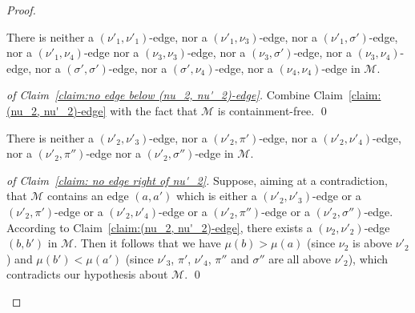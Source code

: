 \documentclass[a4paper]{llncs}
\begin{document}
\begin{proof}
  \begin{claim}
    \label{claim:no edge below (nu_2, nu'_2)-edge}
    There is
    neither a $(\nu'_1, \nu'_1)$-edge,
    nor a $(\nu'_1, \nu_3)$-edge,
    nor a $(\nu'_1, \sigma')$-edge,
    nor a $(\nu'_1, \nu_4)$-edge
    nor a $(\nu_3, \nu_3)$-edge,
    nor a $(\nu_3, \sigma')$-edge,
    nor a $(\nu_3, \nu_4)$-edge,
    nor a $(\sigma', \sigma')$-edge,
    nor a $(\sigma', \nu_4)$-edge,
    nor a $(\nu_4, \nu_4)$-edge
    in $\mathcal{M}$.
  \end{claim}

  \begin{proof}[of Claim~\ref{claim:no edge below (nu_2, nu'_2)-edge}]
    Combine Claim~\ref{claim:(nu_2, nu'_2)-edge} with the fact that
    $\mathcal{M}$ is containment-free.
    \qed
  \end{proof}

  \begin{claim}
    \label{claim: no edge right of nu'_2}
    There is
    neither a $(\nu'_2, \nu'_3)$-edge,
    nor a $(\nu'_2, \pi')$-edge,
    nor a $(\nu'_2, \nu'_4)$-edge,
    nor a $(\nu'_2, \pi'')$-edge
    nor a $(\nu'_2, \sigma'')$-edge
    in $\mathcal{M}$.
  \end{claim}

  \begin{proof}[of Claim~\ref{claim: no edge right of nu'_2}]
    Suppose, aiming at a contradiction, that
    $\mathcal{M}$ contains an edge $(a, a')$ which is
    either a $(\nu'_2, \nu'_3)$-edge
    or a $(\nu'_2, \pi')$-edge
    or a $(\nu'_2, \nu'_4)$-edge
    or a $(\nu'_2, \pi'')$-edge
    or a $(\nu'_2, \sigma'')$-edge.
    According to Claim~\ref{claim:(nu_2, nu'_2)-edge},
    there exists a $(\nu_2, \nu'_2)$-edge $(b, b')$ in $\mathcal{M}$.
    Then it follows that we have
    $\mu(b) > \mu(a)$ (since $\nu_2$ is above $\nu'_2$) and
    $\mu(b') < \mu(a')$ (since $\nu'_3$, $\pi'$, $\nu'_4$, $\pi''$ and
    $\sigma''$ are all above $\nu'_2$),
    which contradicts our hypothesis about $\mathcal{M}$.
    \qed
  \end{proof}


\end{proof}
\end{document}
